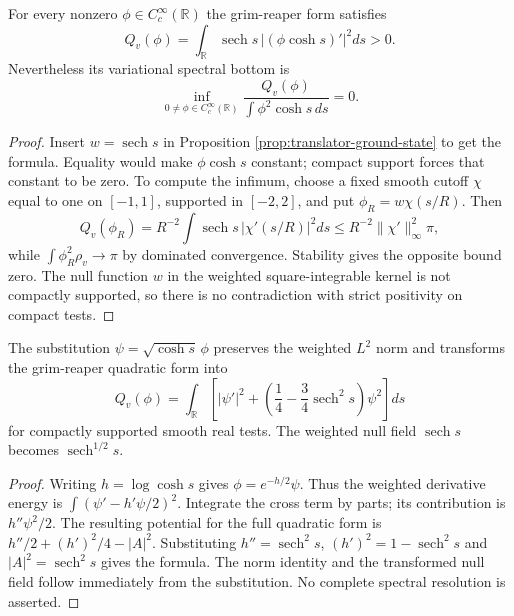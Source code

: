 \begin{proposition}\label{prop:grim-zero-spectral-bottom}
For every nonzero $\phi\in C_c^\infty(\mathbb R)$ the grim-reaper form satisfies
\[
 Q_v(\phi)=\int_{\mathbb R}\operatorname{sech}s\,
             |(\phi\cosh s)'|^2ds>0.
\]
Nevertheless its variational spectral bottom is
\[
 \inf_{0\ne\phi\in C_c^\infty(\mathbb R)}
 \frac{Q_v(\phi)}{\int\phi^2\cosh s\,ds}=0.
\]
\end{proposition}
\begin{proof}
Insert $w=\operatorname{sech}s$ in Proposition \ref{prop:translator-ground-state} to get the formula. Equality would make $\phi\cosh s$ constant; compact support forces that constant to be zero. To compute the infimum, choose a fixed smooth cutoff $\chi$ equal to one on $[-1,1]$, supported in $[-2,2]$, and put $\phi_R=w\chi(s/R)$. Then
\[
 Q_v(\phi_R)=R^{-2}\int\operatorname{sech}s\,|\chi'(s/R)|^2ds
 \le R^{-2}\|\chi'\|_\infty^2\pi,
\]
while $\int\phi_R^2\rho_v\to\pi$ by dominated convergence. Stability gives the opposite bound zero. The null function $w$ in the weighted square-integrable kernel is not compactly supported, so there is no contradiction with strict positivity on compact tests.
\end{proof}

\begin{proposition}\label{prop:grim-schrodinger-form}
The substitution $\psi=\sqrt{\cosh s}\,\phi$ preserves the weighted $L^2$ norm and transforms the grim-reaper quadratic form into
\[
 Q_v(\phi)=\int_{\mathbb R}\left[|\psi'|^2+
       \left(\frac14-\frac34\operatorname{sech}^2s\right)\psi^2\right]ds
\]
for compactly supported smooth real tests. The weighted null field $\operatorname{sech}s$ becomes $\operatorname{sech}^{1/2}s$.
\end{proposition}
\begin{proof}
Writing $h=\log\cosh s$ gives $\phi=e^{-h/2}\psi$. Thus the weighted derivative energy is $\int(\psi'-h'\psi/2)^2$. Integrate the cross term by parts; its contribution is $h''\psi^2/2$. The resulting potential for the full quadratic form is
$h''/2+(h')^2/4-|A|^2$. Substituting $h''=\operatorname{sech}^2s$, $(h')^2=1-\operatorname{sech}^2s$ and $|A|^2=\operatorname{sech}^2s$ gives the formula. The norm identity and the transformed null field follow immediately from the substitution. No complete spectral resolution is asserted.
\end{proof}

